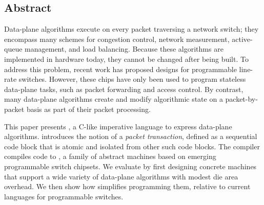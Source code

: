 \subsection*{Abstract}
Data-plane algorithms execute on every packet traversing a network switch; they
encompass many schemes for congestion control, network measurement,
active-queue management, and load balancing. Because these algorithms are
implemented in hardware today, they cannot be changed after being built. To
address this problem, recent work has proposed designs for programmable
line-rate switches.  However, these chips have only been used to program
stateless data-plane tasks, such as packet forwarding and access control. By
contrast, many data-plane algorithms create and modify algorithmic state on a
packet-by-packet basis as part of their packet processing.

This paper presents \pktlanguage, a C-like imperative language to express
data-plane algorithms. \pktlanguage introduces the notion of a {\em packet
transaction}, defined as a sequential code block that is atomic and isolated
from other such code blocks.  The \pktlanguage compiler compiles \pktlanguage
code to \absmachine, a family of abstract machines based on emerging
programmable switch chipsets. We evaluate \pktlanguage by first designing
concrete \absmachine machines that support a wide variety of data-plane
algorithms with modest die area overhead. We then show how \pktlanguage
simplifies programming them, relative to current languages for programmable
switches.
